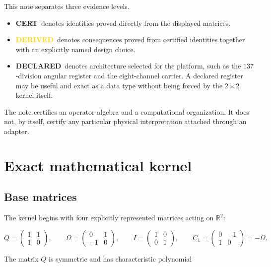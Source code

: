 \documentclass[11pt,letterpaper]{article}
\theoremstyle{clearonyx}
\newcommand{\R}{\mathbb{R}}
\newcommand{\statuscert}{\textcolor{certgreen}{\textbf{CERT}}}
\newcommand{\statusderived}{\textcolor{gold}{\textbf{DERIVED}}}
\newcommand{\statusdeclared}{\textcolor{declareblue}{\textbf{DECLARED}}}
\begin{document}
\begin{boundarybox}
This note separates three evidence levels.

\begin{itemize}
  \item \statuscert\ denotes identities proved directly from the displayed matrices.
  \item \statusderived\ denotes consequences proved from certified identities together with an explicitly named design choice.
  \item \statusdeclared\ denotes architecture selected for the platform, such as the $137$-division angular register and the eight-channel carrier.  A declared register may be useful and exact as a data type without being forced by the $2\times2$ kernel itself.
\end{itemize}

The note certifies an operator algebra and a computational organization.  It does not, by itself, certify any particular physical interpretation attached through an adapter.
\end{boundarybox}

\section{Exact mathematical kernel}

\subsection{Base matrices}

The kernel begins with four explicitly represented matrices acting on $\R^2$:

\begin{equation}
Q=
\begin{pmatrix}
1&1\\
1&0
\end{pmatrix},
\qquad
\Omega=
\begin{pmatrix}
0&1\\
-1&0
\end{pmatrix},
\qquad
I=
\begin{pmatrix}
1&0\\
0&1
\end{pmatrix},
\qquad
C_1=
\begin{pmatrix}
0&-1\\
1&0
\end{pmatrix}=-\Omega.
\end{equation}

The matrix $Q$ is symmetric and has characteristic polynomial
\end{document}
